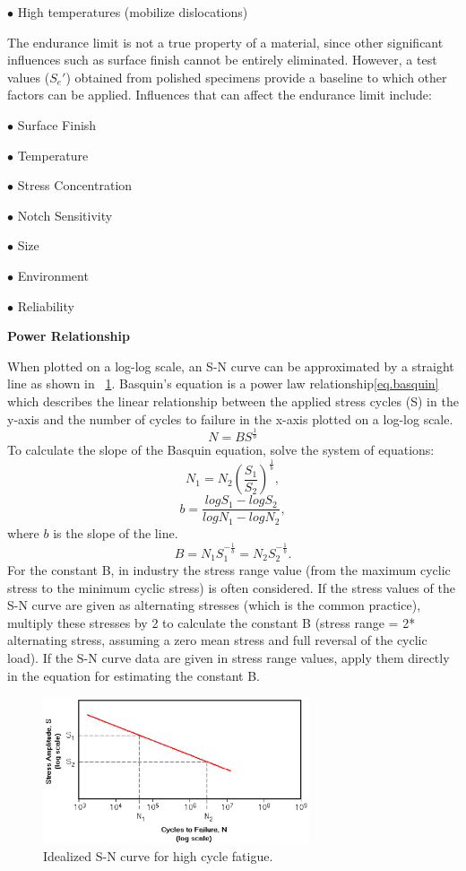 \documentclass[3p,times,procedia,number]{elsarticle}
\newcommand{\figref}[1]{\figurename~\ref{#1}}
\begin{document}
$\bullet$ High temperatures (mobilize dislocations)
\vspace{6pt}     

The endurance limit is not a true property of a material, since other significant influences such
as surface finish cannot be entirely eliminated. However, a test values ($S_e'$) obtained from
polished specimens provide a baseline to which other factors can be applied. Influences that
can affect the endurance limit include:

\vspace{6pt}
$\bullet$ Surface Finish

$\bullet$ Temperature

$\bullet$ Stress Concentration

$\bullet$ Notch Sensitivity

$\bullet$ Size

$\bullet$ Environment

$\bullet$ Reliability
\vspace{6pt}         

\textbf{Power Relationship}   

When plotted on a log-log scale, an S-N curve can be approximated by a straight line as shown
in \figref{fig.basquin}. Basquin’s equation is a power law relationship\ref{eq.basquin} which describes the linear relationship between the applied stress cycles (S) in the y-axis and the number of cycles to failure in the x-axis plotted on a log-log scale.
\begin{equation}
	N=BS^\frac{1}{b}
	\label{eq.basquin}
\end{equation}
To calculate the slope of the Basquin equation, solve the system of equations:
$$N_1=N_2\left(\dfrac{S_1}{S_2}\right)^\frac{1}{b},$$
$$b=\dfrac{logS_1-logS_2}{logN_1-logN_2},$$
where $b$ is the slope of the line.
$$B=N_1S_1^{-\frac{1}{b}}=N_2S_2^{-\frac{1}{b}}.$$
For the constant B, in industry  the stress range value (from the maximum cyclic stress to the minimum cyclic stress) is often considered. If the stress values of the S-N curve are given as alternating stresses (which is the common practice), multiply these stresses by 2 to calculate the constant B (stress range = 2* alternating stress, assuming a zero mean stress and full reversal of the cyclic load). If the S-N curve data are given in stress range values, apply them directly in the equation for estimating the constant B. 

\begin{figure}[h!]
	\centering
	\includegraphics[width=0.7\textwidth]{figures//basquin.png} 
	\caption{Idealized S-N curve for high cycle fatigue.}
	\label{fig.basquin}
\end{figure}
\end{document}
